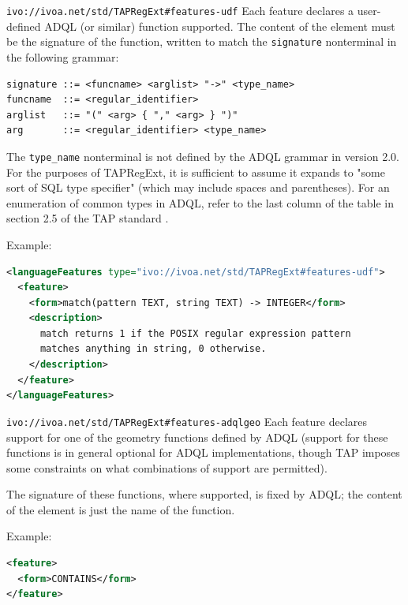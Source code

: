 \documentclass{ivoa}
\begin{document}
\begin{bigdescription}
\item[\nolinkurl{ivo://ivoa.net/std/TAPRegExt\#features-udf}] Each feature declares a user-defined ADQL (or similar) function supported.
    The content of the  element
    must be the signature of the function, written to match the
    \texttt{signature} nonterminal in the following grammar:


\begin{verbatim}
signature ::= <funcname> <arglist> "->" <type_name>
funcname  ::= <regular_identifier>
arglist   ::= "(" <arg> { "," <arg> } ")"
arg       ::= <regular_identifier> <type_name>
\end{verbatim}

The \texttt{type\_name} nonterminal is not defined by the ADQL
		grammar in version 2.0. 
		For the purposes of TAPRegExt, it is sufficient to assume
		it expands to "some sort of SQL type specifier" (which may
		include spaces and parentheses).  For an enumeration of common types
		in ADQL, refer to the last column of the table in section 2.5 of 
		the TAP standard \citep{std:TAP}.

Example:


\begin{lstlisting}[language=XML,basicstyle=\footnotesize]
<languageFeatures type="ivo://ivoa.net/std/TAPRegExt#features-udf">
  <feature>
    <form>match(pattern TEXT, string TEXT) -> INTEGER</form>
    <description>
      match returns 1 if the POSIX regular expression pattern 
      matches anything in string, 0 otherwise.
    </description>
  </feature>
</languageFeatures>
\end{lstlisting}


\item[\nolinkurl{ivo://ivoa.net/std/TAPRegExt\#features-adqlgeo}] Each feature declares support for one of the geometry functions 
		defined by ADQL
    (support for these functions is in general optional for ADQL
    implementations, though TAP imposes some constraints on what 
    combinations of support are permitted).

The signature of these functions, where supported, is fixed by ADQL;
    the content of the  element
    is just the name of the function.

Example:


\begin{lstlisting}[language=XML,basicstyle=\footnotesize]
<feature>
  <form>CONTAINS</form>
</feature>
\end{lstlisting}



\end{bigdescription}
\end{document}
